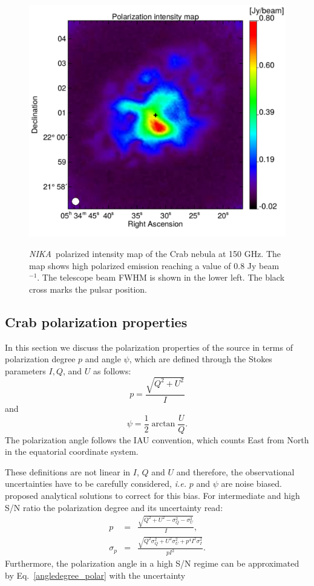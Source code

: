 \documentclass[twocolumn,traditabstract]{aa}
\def\NIKA{\textit{NIKA}}
\begin{document}
 \begin{figure}
  \centering
      {\includegraphics[width=0.75\linewidth,keepaspectratio]{figures/Crab_ipol_v3_2mm.pdf}}
\caption{\NIKA\ polarized intensity map of the  Crab nebula at 150 GHz. The map shows high polarized emission reaching a value of 0.8 Jy beam$^{-1}$. The telescope beam FWHM is shown in the lower left. The black cross marks the pulsar position.}
\label{crab_ipol_maps}		
  \end{figure}

\subsection{Crab polarization properties}\label{sec:pol_properties}
In this section we discuss the polarization properties of the source in terms of polarization degree $p$ and angle $\psi$, which are defined through the Stokes parameters $I, Q$, and $U$ as follows:
\begin{equation}
 p    = \frac{\sqrt{Q^2 + U^2}}{I} \nonumber 
\end{equation}
and
 \begin{equation}
 \psi = \frac{1}{2}\arctan\frac{U}{Q}.\label{angledegree_polar}
 \end{equation}
The polarization angle follows the IAU convention, which counts East from North in the equatorial coordinate system.

These definitions are not linear in $I$, $Q$ and $U$ and therefore, the observational uncertainties have to be carefully considered, {\it i.e.} $p$ and $\psi$ are noise biased. 
\citet{1980A&A....91...97S,1985A&A...142..100S,montier} proposed analytical solutions to correct for this bias. For intermediate and high S/N ratio the polarization degree and its uncertainty read:
 \begin{eqnarray}
 p    &=& \frac{\sqrt{Q^2 + U^2 - \sigma_{Q}^2 - \sigma_{U}^2}}{I}, \nonumber \\ 
  \sigma_{p} &=& \frac{\sqrt{Q^2\sigma_Q^2 + U^2\sigma_U^2 + p^4I^2\sigma_I^2}}{pI^2}.
  \label{p_true_degree}
 \end{eqnarray}
Furthermore, the polarization angle in a high S/N regime can be approximated by Eq.~\ref{angledegree_polar} with the uncertainty
 
\end{document}
